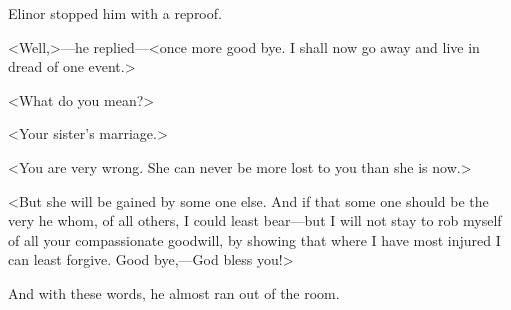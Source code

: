 Elinor stopped him with a reproof.

<Well,>—he replied—<once more good bye. I shall now go away and live in dread of one event.>

<What do you mean?>

<Your sister's marriage.>

<You are very wrong. She can never be more lost to you than she is now.>

<But she will be gained by some one else. And if that some one should be the very he whom, of all others, I could least bear—but I will not stay to rob myself of all your compassionate goodwill, by showing that where I have most injured I can least forgive. Good bye,—God bless you!>

And with these words, he almost ran out of the room.